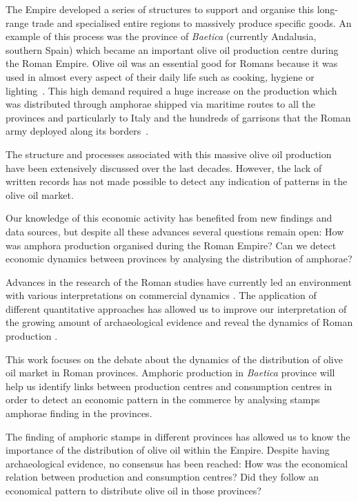 \documentclass[review]{elsarticle}
\newcommand{\memo}[2]{\textcolor{#1}{#2}}
\newcommand{\xavi}[1]{\memo{magenta}{XRC: #1\\}}
\begin{document}
The Empire developed a series of structures to support and organise this long-range trade and specialised entire regions to massively produce specific goods. An example of this process was the province of \textit{Baetica} (currently Andalusia, southern Spain) which became an important olive oil production centre during the Roman Empire. Olive oil was an essential good for Romans because it was used in almost every aspect of their daily life such as cooking, hygiene or lighting~\citep{mattingly_d.j._oil_1988}. This high demand required a huge increase on the production which was distributed through amphorae shipped via maritime routes to all the provinces and particularly to Italy and the hundreds of garrisons that the Roman army deployed along its borders~\citep{blazquez_exportacion_1980}. 

The structure and processes associated with this massive olive oil production have been extensively discussed over the last decades\citep{rodriguez_economioleicola_1977, Chic_hispania_1997,millet_anforas_1998}. 
However, the lack of written records has not made possible to detect any indication of patterns in the olive oil market.

Our knowledge of this economic activity has benefited from new findings and data sources, but despite all these advances several questions remain open: How was amphora production organised during the Roman Empire? Can we detect economic dynamics between provinces by analysing the distribution of amphorae?

Advances in the research of the Roman studies have currently led an environment with various interpretations on commercial dynamics \citep{duncan1982economy,
temin_economy_2006,
quantifyingwilson2009}.
The application of different quantitative approaches has allowed us to improve our interpretation of the growing amount of archaeological evidence and reveal the dynamics of Roman production
\citep{brughmans_roman_2016,
orengo_seeds_2016,bayesian_2018,
coto-sarmiento_identifying_2018,
rubio-campillo_ecology_2018}.

This work focuses on the debate about the dynamics of the distribution of olive oil market in Roman provinces. Amphoric production in \textit{Baetica} province will help us identify links between production centres and consumption centres in order to detect an economic pattern in the commerce by analysing stamps amphorae finding in the provinces. 

The finding of amphoric stamps in different provinces has allowed us to know the importance of the distribution of olive oil within the Empire. Despite having archaeological evidence, no consensus has been reached: How was the economical relation between production and consumption centres? Did they follow an economical pattern to distribute olive oil in those provinces?
  
\end{document}
